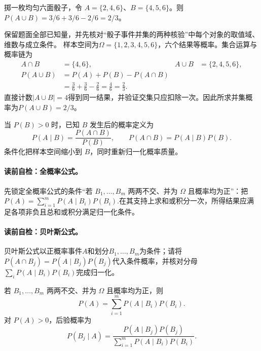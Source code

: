 \begin{example}[骰子事件并集的两种核验]\label{exm:V1-C04-dice}
掷一枚均匀六面骰子，令 $A=\{2,4,6\}$、$B=\{4,5,6\}$。则 $P(A\cup B)=3/6+3/6-2/6=2/3$。
\end{example}
\begin{solution}
\SolGiven 保留题面全部已知量，并先核对“骰子事件并集的两种核验”中每个对象的取值域、维数与成立条件。
\SolDerive
样本空间为$\Omega=\{1,2,3,4,5,6\}$，六个结果等概率。集合运算与概率链为
\[
\begin{aligned}
A\cap B&=\{4,6\},
&A\cup B&=\{2,4,5,6\},\\
P(A\cup B)
&=P(A)+P(B)-P(A\cap B)\\
&=\frac36+\frac36-\frac26
=\frac46=\frac23.
\end{aligned}
\]
直接计数$|A\cup B|=4$得到同一结果，并验证交集只应扣除一次。因此所求并集概率为$P(A\cup B)=2/3$。
\end{solution}
当 $P(B)>0$ 时，已知 $B$ 发生后的概率定义为
\[
P(A\mid B)=\frac{P(A\cap B)}{P(B)},\qquad
P(A\cap B)=P(A\mid B)P(B).
\]
条件化把样本空间缩小到 $B$，同时重新归一化概率质量。

\paragraph{读前自检：全概率公式。}先锁定全概率公式的条件“若 $B_1,\ldots,B_m$ 两两不交、并为 $\Omega$ 且概率均为正”：把$P(A)=\sum_{i=1}^{m}P(A\mid B_i)P(B_i).$在其支持上求和或积分一次，所得结果应满足各项非负且总和或积分满足归一化条件。\par
\paragraph{读前自检：贝叶斯公式。}贝叶斯公式以正概率事件$A$和划分$B_1,\ldots,B_m$为条件；请将$P(A\cap B_j)=P(A\mid B_j)P(B_j)$代入条件概率，并核对分母$\sum_iP(A\mid B_i)P(B_i)$完成归一化。\par

若 $B_1,\ldots,B_m$ 两两不交、并为 $\Omega$ 且概率均为正，则
\[
P(A)=\sum_{i=1}^{m}P(A\mid B_i)P(B_i).
\]
对 $P(A)>0$，后验概率为
\[
P(B_j\mid A)=\frac{P(A\mid B_j)P(B_j)}{\sum_{i=1}^{m}P(A\mid B_i)P(B_i)}.
\]

